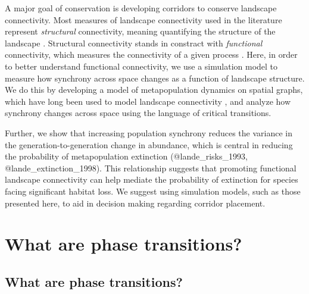 \documentclass[]{article}
\begin{document}
A major goal of conservation is developing corridors to conserve
landscape connectivity. Most measures of landscape connectivity used in the literature represent \emph{structural} connectivity, meaning quantifying the
structure of the landscape \cite{}. Structural connectivity stands in constract with \emph{functional} connectivity, which measures the connectivity of a given process \cite{kool_population_2013, calabrese_comparison-shoppers_2004}. Here,
in order to better understand functional connectivity, we use a
simulation model to measure how synchrony across space changes as a
function of landscape structure. We do this by developing a model of
metapopulation dynamics on spatial graphs, which have long been used to
model landscape connectivity \cite{martensen_spatio-temporal_2017,
@albert_applying_2017, @urban_landscape_2001}, and analyze how
synchrony changes across space using the language of critical
transitions.

Further, we show that increasing population synchrony reduces the
variance in the generation-to-generation change in abundance, which is
central in reducing the probability of metapopulation extinction
(@lande\_risks\_1993, @lande\_extinction\_1998). This relationship
suggests that promoting functional landscape connectivity can help
mediate the probability of extinction for species facing significant
habitat loss. We suggest using simulation models, such as those
presented here, to aid in decision making regarding corridor placement.

\section{What are phase transitions?}


\hypertarget{what-are-phase-transitions}{%
\subsection{What are phase
transitions?}\label{what-are-phase-transitions}}
\end{document}
